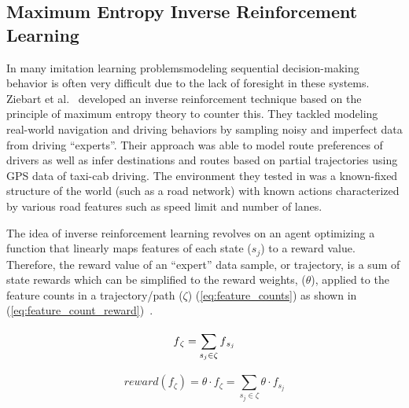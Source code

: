 \documentclass[12pt,american]{report}
\providecommand{\DIFaddtex}[1]{{\protect\color{blue}\uwave{#1}}} %
\providecommand{\DIFaddbegin}{} %
\providecommand{\DIFaddend}{} %
\providecommand{\DIFadd}[1]{\texorpdfstring{\DIFaddtex{#1}}{#1}} %
\newcommand{\DIFaddincludegraphics}[2][]{{\color{blue}\fbox{\DIFOincludegraphics[#1]{#2}}}} %
\DeclareRobustCommand{\DIFaddbegin}{\DIFOaddbegin \let\includegraphics\DIFaddincludegraphics} %
\DeclareRobustCommand{\DIFaddend}{\DIFOaddend \let\includegraphics\DIFOincludegraphics} %
\begin{document}
\subsection{Maximum Entropy Inverse Reinforcement Learning}
\label{sec:maxentirl}
In many imitation learning problems\DIFaddbegin \DIFadd{, }\DIFaddend modeling sequential decision-making behavior is often very difficult due to the lack of foresight in these systems. Ziebart et al.~\cite{ziebart2008maximum} developed an inverse reinforcement technique based on the principle of maximum entropy theory to counter this.  They tackled modeling real-world navigation and driving behaviors by sampling noisy and imperfect data from driving ``experts''.  Their approach was able to model route preferences of drivers as well as infer destinations and routes based on partial trajectories using GPS data of taxi-cab driving.  The environment they tested in was a known-fixed structure of the world (such as a road network) with known actions characterized by various road features such as speed limit and number of lanes.

The idea of inverse reinforcement learning revolves on an agent optimizing a function that linearly maps features of each state (\textit{$s_j$}) to a reward value. Therefore, the reward value of an ``expert'' data sample, or trajectory, is a sum of state rewards which can be simplified to the reward weights, (\textit{$\theta$}), applied to the feature counts in a trajectory/path ($\zeta$) (\ref{eq:feature_counts}) as shown in (\ref{eq:feature_count_reward})~\cite{ziebart2008maximum}. 

\begin{equation}
            \label{eq:feature_counts}
            f\textsubscript{$\zeta$}= \sum_{s_j\in\zeta}^{}f\textsubscript{$s_j$}%
        \end{equation}

\begin{equation}
            \label{eq:feature_count_reward}
		 reward(f_{\zeta})=\theta \cdot f_{\zeta} = \sum_{s_j \in \zeta}^{} \theta \cdot f_{s_j}
        \end{equation}
\end{document}
